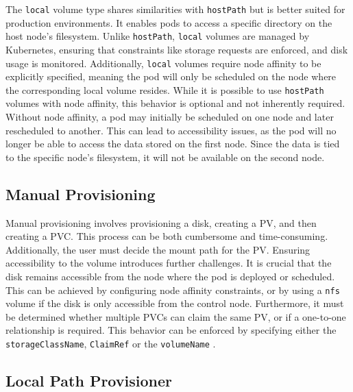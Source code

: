 The \texttt{local} volume type shares similarities with \texttt{hostPath} but is better suited for production environments. It enables pods to access a specific directory on the host node's filesystem. Unlike \texttt{hostPath}, \texttt{local} volumes are managed by Kubernetes, ensuring that constraints like storage requests are enforced, and disk usage is monitored. Additionally, \texttt{local} volumes require node affinity to be explicitly specified, meaning the pod will only be scheduled on the node where the corresponding local volume resides. While it is possible to use \texttt{hostPath} volumes with node affinity, this behavior is optional and not inherently required. Without node affinity, a pod may initially be scheduled on one node and later rescheduled to another. This can lead to accessibility issues, as the pod will no longer be able to access the data stored on the first node. Since the data is tied to the specific node's filesystem, it will not be available on the second node. 

\subsection{Manual Provisioning} 

Manual provisioning involves provisioning a disk, creating a PV, and then creating a PVC. This process can be both cumbersome and time-consuming. Additionally, the user must decide the mount path for the PV. Ensuring accessibility to the volume introduces further challenges. It is crucial that the disk remains accessible from the node where the pod is deployed or scheduled. This can be achieved by configuring node affinity constraints, or by using a \texttt{nfs} volume if the disk is only accessible from the control node. Furthermore, it must be determined whether multiple PVCs can claim the same PV, or if a one-to-one relationship is required. This behavior can be enforced by specifying either the \texttt{storageClassName}, \texttt{ClaimRef} or the \texttt{volumeName} \Parencite{kubernetesPersistentVolumes}.

\subsection{Local Path Provisioner} 

